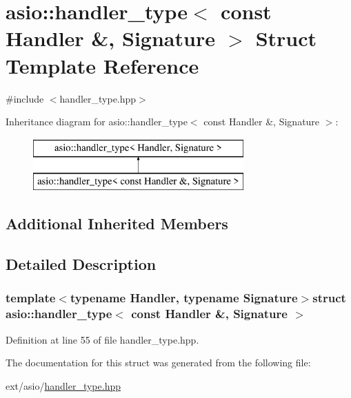 \hypertarget{structasio_1_1handler__type_3_01const_01_handler_01_6_00_01_signature_01_4}{}\section{asio\+:\+:handler\+\_\+type$<$ const Handler \&, Signature $>$ Struct Template Reference}
\label{structasio_1_1handler__type_3_01const_01_handler_01_6_00_01_signature_01_4}


{\ttfamily \#include $<$handler\+\_\+type.\+hpp$>$}

Inheritance diagram for asio\+:\+:handler\+\_\+type$<$ const Handler \&, Signature $>$\+:\begin{figure}[H]
\begin{center}
\leavevmode
\includegraphics[height=2.000000cm]{structasio_1_1handler__type_3_01const_01_handler_01_6_00_01_signature_01_4}
\end{center}
\end{figure}
\subsection*{Additional Inherited Members}


\subsection{Detailed Description}
\subsubsection*{template$<$typename Handler, typename Signature$>$struct asio\+::handler\+\_\+type$<$ const Handler \&, Signature $>$}



Definition at line 55 of file handler\+\_\+type.\+hpp.



The documentation for this struct was generated from the following file\+:\begin{DoxyCompactItemize}
\item 
ext/asio/\hyperlink{handler__type_8hpp}{handler\+\_\+type.\+hpp}\end{DoxyCompactItemize}

